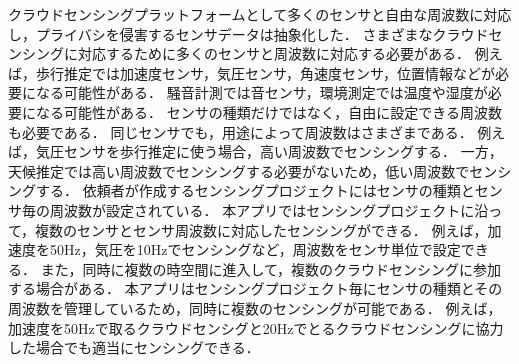 クラウドセンシングプラットフォームとして多くのセンサと自由な周波数に対応し，プライバシを侵害するセンサデータは抽象化した．
さまざまなクラウドセンシングに対応するために多くのセンサと周波数に対応する必要がある．
例えば，歩行推定では加速度センサ，気圧センサ，角速度センサ，位置情報などが必要になる可能性がある．
騒音計測では音センサ，環境測定では温度や湿度が必要になる可能性がある．
センサの種類だけではなく，自由に設定できる周波数も必要である．
同じセンサでも，用途によって周波数はさまざまである．
例えば，気圧センサを歩行推定に使う場合，高い周波数でセンシングする．
一方，天候推定では高い周波数でセンシングする必要がないため，低い周波数でセンシングする．
依頼者が作成するセンシングプロジェクトにはセンサの種類とセンサ毎の周波数が設定されている．
本アプリではセンシングプロジェクトに沿って，複数のセンサとセンサ周波数に対応したセンシングができる．
例えば，加速度を50Hz，気圧を10Hzでセンシングなど，周波数をセンサ単位で設定できる．
また，同時に複数の時空間に進入して，複数のクラウドセンシングに参加する場合がある．
本アプリはセンシングプロジェクト毎にセンサの種類とその周波数を管理しているため，同時に複数のセンシングが可能である．
例えば，加速度を50Hzで取るクラウドセンシグと20Hzでとるクラウドセンシングに協力した場合でも適当にセンシングできる．




